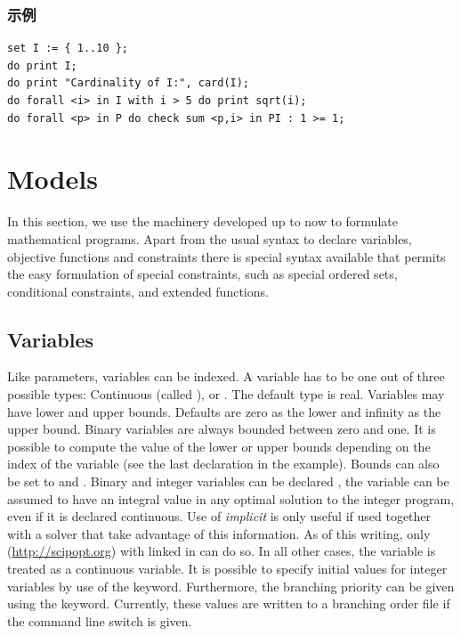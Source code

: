 \subsubsection{示例}
{\small
\begin{verbatim}
set I := { 1..10 };
do print I;
do print "Cardinality of I:", card(I);
do forall <i> in I with i > 5 do print sqrt(i);
do forall <p> in P do check sum <p,i> in PI : 1 >= 1;
\end{verbatim}
}



\section{Models}
In this section, we use the machinery developed up to now to
formulate mathematical programs. Apart from the usual syntax to
declare variables, objective functions and constraints there is
special syntax available that permits the easy formulation of special
constraints, such as special ordered sets, conditional constraints,
and extended functions.

\subsection{Variables}
Like parameters, variables can be indexed.
A variable has to be one out of three possible types:
Continuous (called ),  or . The default type is real.
Variables may have lower and upper bounds. Defaults are
zero as the lower and infinity as the upper bound. Binary variables are
always bounded between zero and one.
It is possible to compute the value of the lower or upper bounds
depending on the index of the variable (see the last declaration in the
example). Bounds can also be set to  and .
Binary and integer variables can be declared , \ie the
variable can be assumed to have an integral value in any optimal
solution to the integer program, even if it is declared continuous.
Use of \emph{implicit} is only useful if used together with a solver
that take advantage of this information. As of this writing, only \scip
(\url{http://scipopt.org}) with linked in \zimpl can do so.
In all other cases, the variable is treated as a continuous variable.
It is possible to specify initial values for integer variables by use
of the  keyword. Furthermore, the branching  priority
can be given using the  keyword. Currently, these
values are written to a \cplex {} branching order file if the
 command line switch is given.

